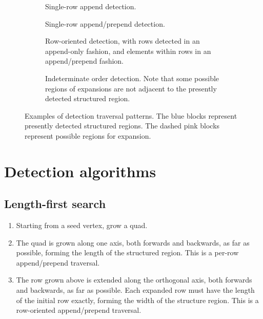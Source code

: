 \begin{figure}
\begin{subfigure}[t]{0.45\textwidth}
	\centering
	
	\caption{Single-row append detection.}
\end{subfigure}
\begin{subfigure}[t]{0.45\textwidth}
	\centering
	
	\caption{Single-row append/prepend detection.}
\end{subfigure}
\begin{subfigure}[b]{0.45\textwidth}
	\centering
	
	\vspace{4.5mm}
	\caption{Row-oriented detection, with rows detected in an append-only fashion, and elements within rows in an append/prepend fashion.}
\end{subfigure}
\begin{subfigure}[b]{0.45\textwidth}
	\centering
	
	\caption{Indeterminate order detection. Note that some possible regions of expansions are not adjacent to the presently detected structured region.}
\end{subfigure}

\caption{Examples of detection traversal patterns. The blue blocks represent presently detected structured regions. The dashed pink blocks represent possible regions for expansion.\label{fig:detection-traversal-patterns}}
\end{figure}



\section{Detection algorithms}

\subsection{Length-first search}

\begin{enumerate}
\item Starting from a seed vertex, grow a quad.

\item The quad is grown along one axis, both forwards and backwards, as far as possible, forming the length of the structured region. This is a per-row append/prepend traversal.
\item The row grown above is extended along the orthogonal axis, both forwards and backwards, as far as possible. Each expanded row must have the length of the initial row exactly, forming the width of the structure region. This is a row-oriented append/prepend traversal.
\end{enumerate}

